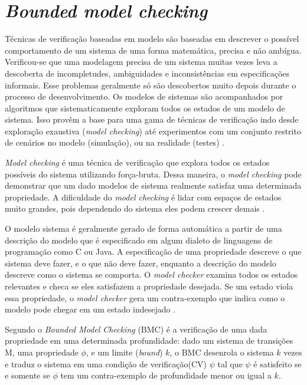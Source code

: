\section{\textit{Bounded model checking}}
\label{sec:bmc}
Técnicas de verificação baseadas em modelo são baseadas em descrever o possível comportamento de um sistema de uma forma matemática, precisa e não ambígua. Verificou-se que uma modelagem precisa de um sistema muitas vezes leva a descoberta de incompletudes, ambiguidades e inconsistências em especificações informais. Esse problemas geralmente só são descobertos muito depois durante o processo de desenvolvimento. Os modelos de sistemas são acompanhados por algoritmos que sistematicamente exploram todos os estados de um modelo de sistema. Isso provêm a base para uma gama de técnicas de verificação indo desde exploração exaustiva (\textit{model checking}) até experimentos com um conjunto restrito de cenários no modelo (simulação), ou na realidade (testes) \cite{Baier:2008}.
\par
\textit{Model checking} é uma técnica de verificação que explora todos os estados possíveis do sistema utilizando força-bruta. Dessa maneira, o \textit{model checking} pode demonstrar que um dado modelos de sistema realmente satisfaz uma determinada propriedade. A dificuldade do \textit{model checking} é lidar com espaços de estados muito grandes, pois dependendo do sistema eles podem crescer demais  \cite{Baier:2008}. 
\par
O modelo sistema é geralmente gerado de forma automática a partir de uma descrição do modelo que é especificado em algum dialeto de linguagens de programação como C ou Java. A especificação de uma propriedade descreve o que sistema deve fazer, e o que não deve fazer, enquanto a descrição do modelo descreve como o sistema se comporta. O \textit{model checker} examina todos os estados relevantes e checa se eles satisfazem a propriedade desejada. Se um estado viola essa propriedade, o \textit{model checker} gera um contra-exemplo que indica como o modelo pode chegar em um estado indesejado \cite{Baier:2008}.
\par
Segundo  o \textit{Bounded Model Checking} (BMC) é a verificação de uma dada propriedade em uma determinada profundidade: dado um sistema de transições M, uma propriedade $\phi$, e um limite (\textit{bound}) $k$, o BMC desenrola o sistema $k$ vezes e traduz o sistema em uma condição de verificação(CV) $\psi$ tal que $\psi$ é satisfeito se e somente se $\phi$ tem um contra-exemplo de profundidade menor ou igual a $k$.

